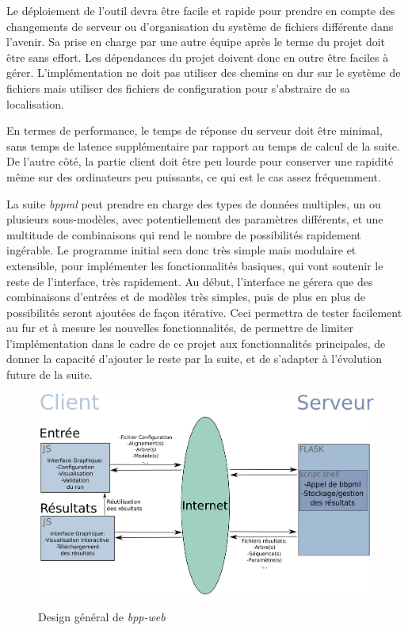 Le déploiement de l'outil devra être facile et rapide
pour prendre en compte des changements de serveur
ou d'organisation du système de fichiers différente dans l'avenir.
Sa prise en charge par une autre équipe après le terme du projet
doit être sans effort.
Les dépendances du projet doivent donc en outre
être faciles à gérer.
L'implémentation ne doit pas utiliser des chemins en dur sur le système de fichiers
mais utiliser des fichiers de configuration
pour s'abstraire de sa localisation.

En termes de performance,
le temps de réponse du serveur doit être minimal,
sans temps de latence supplémentaire par rapport au temps de calcul de la suite.
De l'autre côté, la partie client doit être peu lourde
pour conserver une rapidité même sur des ordinateurs peu puissants,
ce qui est le cas assez fréquemment.

La suite \textit{bppml} peut prendre en charge
des types de données multiples, un ou plusieurs sous-modèles,
avec potentiellement des paramètres différents,
et une multitude de combinaisons
qui rend le nombre de possibilités rapidement ingérable.
Le programme initial sera donc très simple mais modulaire et extensible,
pour implémenter les fonctionnalités basiques,
qui vont soutenir le reste de l'interface,
très rapidement.
Au début, l'interface ne gérera que
des combinaisons d'entrées et de modèles très simples,
puis de plus en plus de possibilités seront ajoutées de façon itérative.
Ceci permettra
de tester facilement au fur et à mesure les nouvelles fonctionnalités,
de permettre de limiter l'implémentation dans le cadre de ce projet
aux fonctionnalités principales,
de donner la capacité d'ajouter le reste par la suite,
et de s'adapter à l'évolution future de la suite.

\begin{figure}
	\caption{Design général de \textit{bpp-web}}
	\includegraphics[scale=0.5]{fig/SchemaConcept.pdf}
	\centering
	\label{fig:des}
\end{figure}


